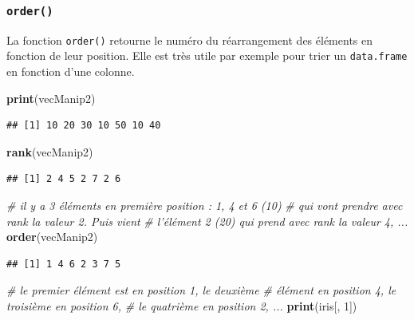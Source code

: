 \documentclass[twoside,symmetric]{book}
\newenvironment{Shaded}{}{}
\newcommand{\CommentTok}[1]{\textit{#1}}
\newcommand{\DecValTok}[1]{#1}
\newcommand{\KeywordTok}[1]{\textbf{#1}}
\newcommand{\NormalTok}[1]{#1}
\begin{document}
\hypertarget{l015order}{%
\subsubsection{\texorpdfstring{\texttt{order()}}{order()}}\label{l015order}}

La fonction \texttt{order()} retourne le numéro du réarrangement des éléments en fonction de leur position. Elle est très utile par exemple pour trier un \texttt{data.frame} en fonction d'une colonne.

\begin{Shaded}
\begin{Highlighting}[]
\KeywordTok{print}\NormalTok{(vecManip2)}
\end{Highlighting}
\end{Shaded}

\begin{verbatim}
## [1] 10 20 30 10 50 10 40
\end{verbatim}

\begin{Shaded}
\begin{Highlighting}[]
\KeywordTok{rank}\NormalTok{(vecManip2)}
\end{Highlighting}
\end{Shaded}

\begin{verbatim}
## [1] 2 4 5 2 7 2 6
\end{verbatim}

\begin{Shaded}
\begin{Highlighting}[]
\CommentTok{# il y a 3 éléments en première position : 1, 4 et 6 (10)}
\CommentTok{# qui vont prendre avec rank la valeur 2. Puis vient}
\CommentTok{# l'élément 2 (20) qui prend avec rank la valeur 4, ...}
\KeywordTok{order}\NormalTok{(vecManip2)}
\end{Highlighting}
\end{Shaded}

\begin{verbatim}
## [1] 1 4 6 2 3 7 5
\end{verbatim}

\begin{Shaded}
\begin{Highlighting}[]
\CommentTok{# le premier élément est en position 1, le deuxième}
\CommentTok{# élément en position 4, le troisième en position 6, }
\CommentTok{# le quatrième en position 2, ...}
\KeywordTok{print}\NormalTok{(iris[, }\DecValTok{1}\NormalTok{])}
\end{Highlighting}
\end{Shaded}
\end{document}
